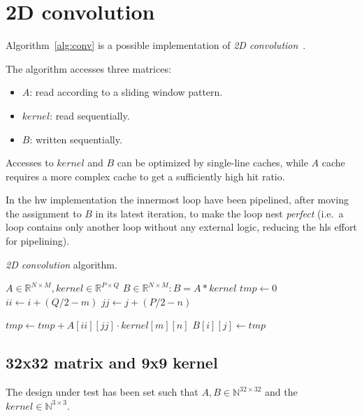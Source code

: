 \documentclass[11pt,a4paper,oneside]{memoir}
\begin{document}
\clearpage

\section{2D convolution}
Algorithm~\ref{alg:conv} is a possible implementation of \emph{2D
convolution}~\cite{conv}.

The algorithm accesses three matrices:
\begin{itemize}
	\item $A$: read according to a sliding window pattern.
	\item $kernel$: read sequentially.
	\item $B$: written sequentially.
\end{itemize}

Accesses to $kernel$ and $B$ can be optimized by single-line caches, while $A$
cache requires a more complex cache to get a sufficiently high hit ratio.

In the \acl{hw} implementation the innermost loop have been pipelined, after
moving the assignment to $B$ in its latest iteration, to make the loop nest
\emph{perfect} (i.e.\ a loop contains only another loop without any external
logic, reducing the \ac{hls} effort for pipelining).

\begin{algorithm}
	\caption{\emph{2D convolution} algorithm.}\label{alg:conv}
	\begin{algorithmic}
		\Require $A \in \mathbb{R}^{N \times M},
		kernel \in \mathbb{R}^{P \times Q}$
		\Ensure $B \in \mathbb{R}^{N \times M} : B = A \ast kernel$
					\State $tmp \gets 0$
							\State $ii \gets
								i + (Q / 2 - m)$
							\State $jj \gets
								j + (P / 2 - n)$

								\State $tmp \gets
									tmp + A[ii][jj] \cdot
									kernel[m][n]$
							\EndIf
						\EndFor
					\EndFor
					\State $B[i][j] \gets tmp$
				\EndFor
			\EndFor
		\EndProcedure
	\end{algorithmic}
\end{algorithm}

\subsection{32x32 matrix and 9x9 kernel}
The design under test has been set such that $A, B \in \mathbb{N}^{32 \times
32}$ and the $kernel \in \mathbb{N}^{3 \times 3}$.
\end{document}
